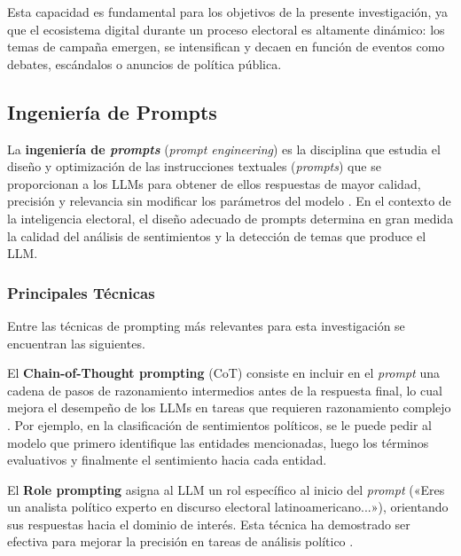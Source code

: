 \documentclass[listof=nochaptergap,12pt,times,authoryear]{report}
\begin{document}
Esta capacidad es fundamental para los objetivos de la presente investigación, ya que el ecosistema digital durante un proceso electoral es altamente dinámico: los temas de campaña emergen, se intensifican y decaen en función de eventos como debates, escándalos o anuncios de política pública.
 
\subsection{Ingeniería de Prompts}
 
La \textbf{ingeniería de \textit{prompts}} (\textit{prompt engineering}) es la disciplina que estudia el diseño y optimización de las instrucciones textuales (\textit{prompts}) que se proporcionan a los LLMs para obtener de ellos respuestas de mayor calidad, precisión y relevancia sin modificar los parámetros del modelo \parencite{tec_white2023prompt}. En el contexto de la inteligencia electoral, el diseño adecuado de prompts determina en gran medida la calidad del análisis de sentimientos y la detección de temas que produce el LLM.
 
\subsubsection{Principales Técnicas}
 
Entre las técnicas de prompting más relevantes para esta investigación se encuentran las siguientes.
 
El \textbf{Chain-of-Thought prompting} (CoT) consiste en incluir en el \textit{prompt} una cadena de pasos de razonamiento intermedios antes de la respuesta final, lo cual mejora el desempeño de los LLMs en tareas que requieren razonamiento complejo \parencite{tec_wei2022cot}. Por ejemplo, en la clasificación de sentimientos políticos, se le puede pedir al modelo que primero identifique las entidades mencionadas, luego los términos evaluativos y finalmente el sentimiento hacia cada entidad.
 
El \textbf{Role prompting} asigna al LLM un rol específico al inicio del \textit{prompt} («Eres un analista político experto en discurso electoral latinoamericano...»), orientando sus respuestas hacia el dominio de interés. Esta técnica ha demostrado ser efectiva para mejorar la precisión en tareas de análisis político \parencite{pr_alvarez2023llm_political}.
 
\end{document}
